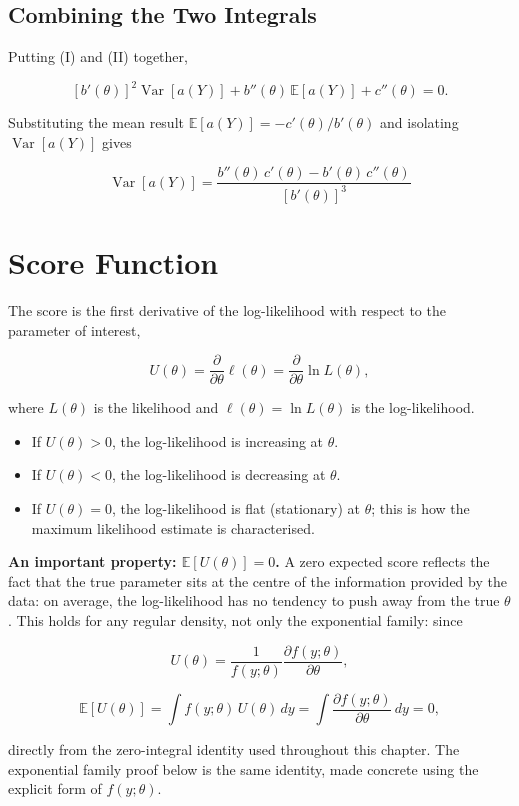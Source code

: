 \subsection*{Combining the Two Integrals}
Putting (I) and (II) together,
\begin{mathbox}
\[
[b'(\theta)]^2\operatorname{Var}[a(Y)] + b''(\theta)\,\mathbb{E}[a(Y)] + c''(\theta) = 0.
\]
\end{mathbox}
Substituting the mean result $\mathbb{E}[a(Y)] = -c'(\theta)/b'(\theta)$ and isolating $\operatorname{Var}[a(Y)]$ gives
\begin{mathbox}
\[
\operatorname{Var}[a(Y)] = \frac{b''(\theta)\,c'(\theta) - b'(\theta)\,c''(\theta)}{[b'(\theta)]^3}
\]
\end{mathbox}

\section{Score Function}
The score is the first derivative of the log-likelihood with respect to the parameter of interest,
\begin{mathbox}
\[
U(\theta) = \frac{\partial}{\partial\theta}\ell(\theta) = \frac{\partial}{\partial\theta}\ln L(\theta),
\]
\end{mathbox}
where $L(\theta)$ is the likelihood and $\ell(\theta)=\ln L(\theta)$ is the log-likelihood.
\begin{itemize}
\item If $U(\theta)>0$, the log-likelihood is increasing at $\theta$.
\item If $U(\theta)<0$, the log-likelihood is decreasing at $\theta$.
\item If $U(\theta)=0$, the log-likelihood is flat (stationary) at $\theta$; this is how the maximum likelihood estimate is characterised.
\end{itemize}

\textbf{An important property: $\mathbb{E}[U(\theta)]=0$.} A zero expected score reflects the fact that the true parameter sits at the centre of the information provided by the data: on average, the log-likelihood has no tendency to push away from the true $\theta$. This holds for any regular density, not only the exponential family: since
\begin{mathbox}
\[
U(\theta) = \frac{1}{f(y;\theta)}\frac{\partial f(y;\theta)}{\partial\theta},
\]
\end{mathbox}
\begin{mathbox}
\[
\mathbb{E}[U(\theta)] = \int f(y;\theta)\,U(\theta)\,dy = \int \frac{\partial f(y;\theta)}{\partial\theta}\,dy = 0,
\]
\end{mathbox}
directly from the zero-integral identity used throughout this chapter. The exponential family proof below is the same identity, made concrete using the explicit form of $f(y;\theta)$.

